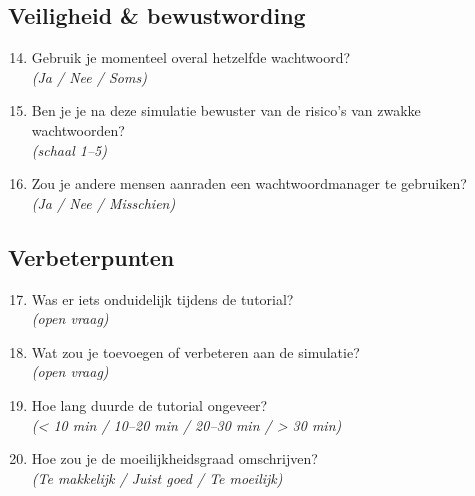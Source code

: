 \subsection{Veiligheid \& bewustwording}
\begin{enumerate}
    \setcounter{enumi}{13}
    \item Gebruik je momenteel overal hetzelfde wachtwoord?\\
    \textit{(Ja / Nee / Soms)}
    
    \item Ben je je na deze simulatie bewuster van de risico's van zwakke wachtwoorden?\\
    \textit{(schaal 1--5)}
    
    \item Zou je andere mensen aanraden een wachtwoordmanager te gebruiken?\\
    \textit{(Ja / Nee / Misschien)}
\end{enumerate}

\subsection{Verbeterpunten}
\begin{enumerate}
    \setcounter{enumi}{16}
    \item Was er iets onduidelijk tijdens de tutorial?\\
    \textit{(open vraag)}
    
    \item Wat zou je toevoegen of verbeteren aan de simulatie?\\
    \textit{(open vraag)}
    
    \item Hoe lang duurde de tutorial ongeveer?\\
    \textit{(< 10 min / 10--20 min / 20--30 min / > 30 min)}
    
    \item Hoe zou je de moeilijkheidsgraad omschrijven?\\
    \textit{(Te makkelijk / Juist goed / Te moeilijk)}
\end{enumerate}